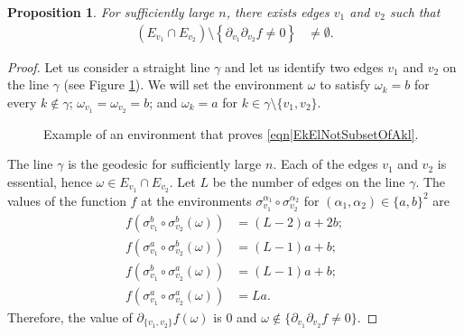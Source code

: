 \documentclass[reqno]{amsart}
\newtheorem{proposition}{Proposition}
\begin{document}
\begin{proposition}
For sufficiently large $n$, there exists edges $v_1$ and $v_2$ such that 
\begin{align}
\left(E_{v_1}\cap E_{v_2}\right) \setminus \left\{\partial_{v_1}\partial_{v_2}f\neq 0\right\} &\neq \emptyset. \label{eqn|EkElNotSubsetOfAkl}
\end{align}
\end{proposition}

\begin{proof}
Let us consider a straight line $\gamma$ and let us identify two edges $v_1$ and $v_2$ on the line $\gamma$ (see Figure \ref{fig|EkElNotSubsetOfAkl}).
 We will set the environment $\omega$ to satisfy $\omega_k=b$ for every $k\not \in \gamma$; $\omega_{v_1}=\omega_{v_2}=b$; and $\omega_k=a$ for $k\in \gamma\setminus\{v_1,v_2\}$.
 \begin{figure}[t]
 \centering
{}
\caption{Example of an environment that proves \eqref{eqn|EkElNotSubsetOfAkl}.}
 \label{fig|EkElNotSubsetOfAkl}
\end{figure}

The line $\gamma$ is the geodesic for sufficiently large $n$. Each of the edges $v_1$ and $v_2$ is essential, hence $\omega\in E_{v_1}\cap E_{v_2}$. 
Let $L$ be the number of edges on the line $\gamma$. The values of the function $f$ at the environments 
$\sigma_{v_1}^{\alpha_1}\circ\sigma_{v_2}^{\alpha_2}$ for $(\alpha_1,\alpha_2)\in\{a,b\}^2$ are \begin{align*} f\left(\sigma_{v_1}^b\circ \sigma_{v_2}^b(\omega)\right) &= (L-2)a+2b;\\
f\left(\sigma_{v_1}^a\circ \sigma_{v_2}^b(\omega)\right) &= (L-1)a+b;\\
f\left(\sigma_{v_1}^b\circ \sigma_{v_2}^a(\omega)\right) &= (L-1)a+b;\\
f\left(\sigma_{v_1}^a\circ \sigma_{v_2}^a(\omega)\right) &= La.
\end{align*}
Therefore, the value of $\partial_{\{v_1,v_2\}}f(\omega)$ is $0$ and $\omega\not\in \{\partial_{v_1}\partial_{v_2}f\neq 0\}$.
\end{proof} 
\end{document}
